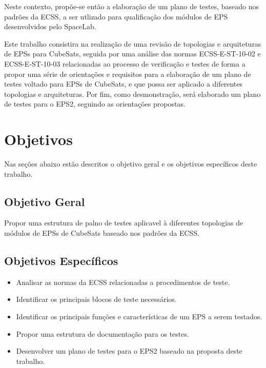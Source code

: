Neste contexto, propõe-se então a elaboração de um plano de testes, baseado nos padrões da \gls{ECSS}, a ser utlizado para qualificação dos módulos de \gls{EPS} desenvolvidos pelo SpaceLab.

Este trabalho consistira na realização de uma revisão de topologias e arquiteturas de EPSs para CubeSats, seguida por uma análise das normas ECSS-E-ST-10-02 \cite{ecss-e-st-10-02} e ECSS-E-ST-10-03 \cite{ecss-e-st-10-03} relacionadas ao processo de verificação e testes de forma a propor uma série de orientações e requisitos para a elaboração de um plano de testes voltado para EPSs de CubeSats, e que possa ser aplicado a diferentes topologias e arquiteturas. Por fim, como desmonstração, será elaborado um plano de testes para o \gls{EPS2}, seguindo as orientações propostas.

\section{Objetivos}\label{sec:objetivos}

Nas seções abaixo estão descritos o objetivo geral e os objetivos específicos deste trabalho.

\subsection{Objetivo Geral}

Propor uma estrutura de palno de testes aplicavel à diferentes topologias de módulos de \gls{EPS}s de CubeSats baseado nos padrões da \gls{ECSS}.

\subsection{Objetivos Específicos}

\begin{itemize}
    \item Analisar as normas da ECSS relacionadas a procedimentos de teste.
    \item Identificar os principais blocos de teste necessários.
    \item Identificar os principais funções e características de um \gls{EPS} a serem testados.
    \item Propor uma estrutura de documentação para os testes.
    \item Desenvolver um plano de testes para o \gls{EPS2} baseado na proposta deste trabalho.
\end{itemize}